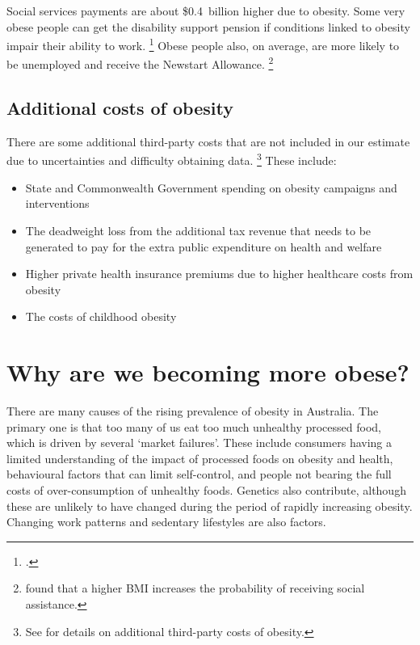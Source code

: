\documentclass[embargoed]{grattan}
\begin{document}
Social services payments are about \$0.4~billion higher due to obesity.
Some very obese people can get the disability support pension if conditions linked to obesity impair their ability to work.%
\footcite{SocialServices2014FrequentlyAskedQuestions} Obese people also, on average, are more likely to be unemployed and receive the Newstart Allowance.%
\footnote{\textcite{Boeckerman2016EffectWeightLabor} found that a higher BMI increases the probability of receiving social assistance.}

\section{Additional costs of obesity }\label{additional-costs-of-obesity}

There are some additional third-party costs that are not included in our estimate due to uncertainties and difficulty obtaining data.%
\footnote{See  for details on additional third-party costs of obesity.} These include:

\begin{itemize}
\item
  State and Commonwealth Government spending on obesity campaigns and interventions
\item
  The deadweight loss from the additional tax revenue that needs to be generated to pay for the extra public expenditure on health and welfare
\item
  Higher private health insurance premiums due to higher healthcare costs from obesity
\item
  The costs of childhood obesity
\end{itemize}

\chapter{Why are we becoming more obese?}\label{why-are-we-becoming-more-obese}

There are many causes of the rising prevalence of obesity in Australia.
The primary one is that too many of us eat too much unhealthy processed food, which is driven by several `market failures'.
These include consumers having a limited understanding of the impact of processed foods on obesity and health, behavioural factors that can limit self-control, and people not bearing the full costs of over-consumption of unhealthy foods.
Genetics also contribute, although these are unlikely to have changed during the period of rapidly increasing obesity.
Changing work patterns and sedentary lifestyles are also factors.
\end{document}
